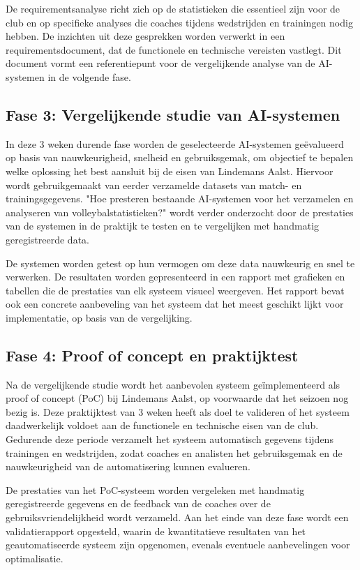 De requirementsanalyse richt zich op de statistieken die essentieel zijn voor de club en op specifieke analyses die coaches tijdens wedstrijden en trainingen nodig hebben. De inzichten uit deze gesprekken worden verwerkt in een requirementsdocument, dat de functionele en technische vereisten vastlegt. Dit document vormt een referentiepunt voor de vergelijkende analyse van de AI-systemen in de volgende fase.
\subsection{Fase 3: Vergelijkende studie van AI-systemen}
In deze 3 weken durende fase worden de geselecteerde AI-systemen geëvalueerd op basis van nauwkeurigheid, snelheid en gebruiksgemak, om objectief te bepalen welke oplossing het best aansluit bij de eisen van Lindemans Aalst. Hiervoor wordt gebruikgemaakt van eerder verzamelde datasets van match- en trainingsgegevens. "Hoe presteren bestaande AI-systemen voor het verzamelen en analyseren van volleybalstatistieken?" wordt verder onderzocht door de prestaties van de systemen in de praktijk te testen en te vergelijken met handmatig geregistreerde data.

De systemen worden getest op hun vermogen om deze data nauwkeurig en snel te verwerken. De resultaten worden gepresenteerd in een rapport met grafieken en tabellen die de prestaties van elk systeem visueel weergeven. Het rapport bevat ook een concrete aanbeveling van het systeem dat het meest geschikt lijkt voor implementatie, op basis van de vergelijking.
\subsection{Fase 4: Proof of concept en praktijktest}
Na de vergelijkende studie wordt het aanbevolen systeem geïmplementeerd als proof of concept (PoC) bij Lindemans Aalst, op voorwaarde dat het seizoen nog bezig is. Deze praktijktest van 3 weken heeft als doel te valideren of het systeem daadwerkelijk voldoet aan de functionele en technische eisen van de club. Gedurende deze periode verzamelt het systeem automatisch gegevens tijdens trainingen en wedstrijden, zodat coaches en analisten het gebruiksgemak en de nauwkeurigheid van de automatisering kunnen evalueren.

De prestaties van het PoC-systeem worden vergeleken met handmatig geregistreerde gegevens en de feedback van de coaches over de gebruiksvriendelijkheid wordt verzameld. Aan het einde van deze fase wordt een validatierapport opgesteld, waarin de kwantitatieve resultaten van het geautomatiseerde systeem zijn opgenomen, evenals eventuele aanbevelingen voor optimalisatie.
